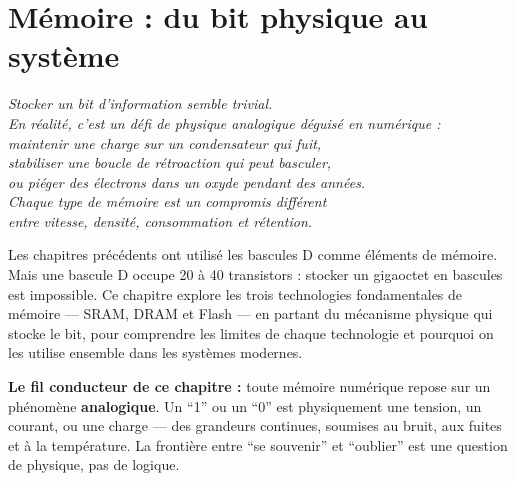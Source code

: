 \documentclass[12pt,a4paper,twoside]{book}
\begin{document}

\chapter{Mémoire : du bit physique au système}

\begin{center}
\textit{Stocker un bit d'information semble trivial.\\
En réalité, c'est un défi de physique analogique déguisé en numérique :\\
maintenir une charge sur un condensateur qui fuit,\\
stabiliser une boucle de rétroaction qui peut basculer,\\
ou piéger des électrons dans un oxyde pendant des années.\\
Chaque type de mémoire est un compromis différent\\
entre vitesse, densité, consommation et rétention.}
\end{center}

\vspace{0.5cm}

Les chapitres précédents ont utilisé les bascules D comme éléments de mémoire. Mais une bascule D occupe 20 à 40 transistors : stocker un gigaoctet en bascules est impossible. Ce chapitre explore les trois technologies fondamentales de mémoire --- SRAM, DRAM et Flash --- en partant du mécanisme physique qui stocke le bit, pour comprendre les limites de chaque technologie et pourquoi on les utilise ensemble dans les systèmes modernes.

\begin{intuition}
\textbf{Le fil conducteur de ce chapitre :} toute mémoire numérique repose sur un phénomène \textbf{analogique}. Un ``1'' ou un ``0'' est physiquement une tension, un courant, ou une charge --- des grandeurs continues, soumises au bruit, aux fuites et à la température. La frontière entre ``se souvenir'' et ``oublier'' est une question de physique, pas de logique.
\end{intuition}
\end{document}
